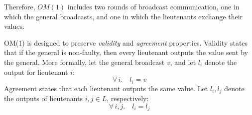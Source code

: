 \documentclass{llncs/llncs}
\newcommand{\OM}[1]{\ensuremath{\mathrm{OM}(#1)}}
\begin{document}
\noindent
Therefore, $OM(1)$ includes two rounds of broadcast communication, one in which the general broadcasts, and one in which the lieutenants exchange their values.




OM(1) is designed to preserve \emph{validity} and \emph{agreement}
properties. Validity states that if the general is non-faulty, then every lieutenant outputs the value sent by the general. More formally, let the general broadcast $v$, and let $l_i$ denote the output for lieutenant $i$:
%
\begin{equation}
  \tag{Validity}
    \forall \,i. \quad l_i = v
\end{equation}
%
Agreement states that each lieutenant outputs the same value. Let $l_i, l_j$ denote the outputs of lieutenants $i, j \in L$, respectively:
%
\begin{equation}
  \tag{Agreement}
    \forall \,i, j. \quad l_i = l_j
\end{equation}
%
\end{document}
